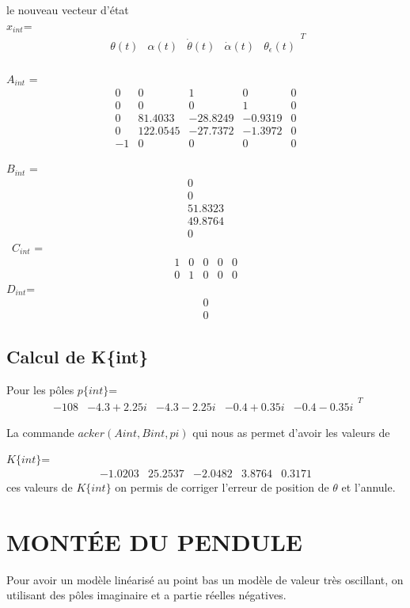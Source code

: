 \documentclass[12pt, a4paper, openany]{report}
\begin{document}
le nouveau vecteur d'état\\

 
 $x_{int}$=
$$ 
 \begin{matrix}
\theta(t) & \alpha(t)& \dot{\theta}(t) & \dot{\alpha}(t)&\theta_{\epsilon}(t) 
\end{matrix}^{T}
 $$
\\

$A_{int}$ =
$$
\begin{matrix}
 0&0&1&0&0\\
 0&0&0&1&0\\
 0&81.4033&-28.8249&-0.9319&0\\
 0&122.0545&-27.7372&-1.3972&0\\
 -1&0&0&0&0
\end{matrix}
$$

$B_{int}$ =
$$
\begin{matrix}
        0\\
         0\\
   51.8323\\
   49.8764\\
         0
\end{matrix}
$$
\quad\quad\quad\
$C_{int}$ =
$$
\begin{matrix}
     1&0&0&0&0\\
     0&1&0&0&0
\end{matrix}
$$
\quad\quad
$D_{int}$=
$$
\begin{matrix}
0\\
0
\end{matrix}
$$

    \section{Calcul de K\{int\}}
    
    Pour les pôles $p\{int\}$=
    $$\begin{matrix}
-108&-4.3+2.25i&-4.3-2.25i&-0.4+0.35i&-0.4-0.35i
\end{matrix}^{T}$$

  La commande $acker(Aint,Bint,pi)$ qui nous as permet d'avoir les valeurs de 
 
 $K\{int\}$=
 $$\begin{matrix}
-1.0203  & 25.2537 &  -2.0482  &  3.8764  &  0.3171
\end{matrix}$$
ces valeurs de $K\{int\}$ on permis de corriger l'erreur de position de $\theta$ et l'annule. 


\chapter{MONTÉE DU PENDULE}
      Pour avoir un modèle linéarisé au point bas un modèle de valeur très oscillant, on utilisant des pôles imaginaire et a partie réelles négatives.   
      
\end{document}

